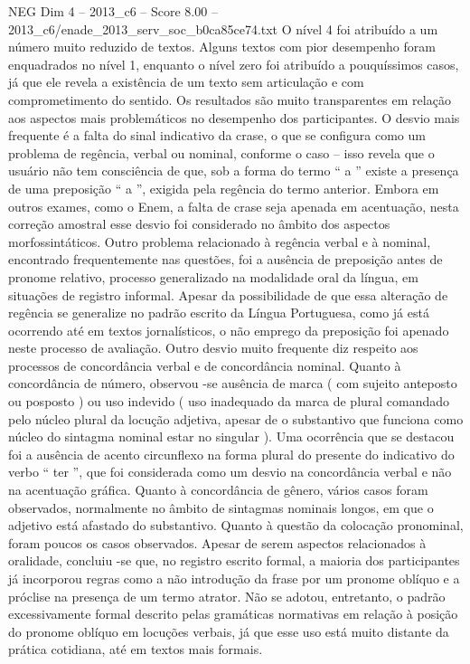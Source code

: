 \begin{textsample}{NEG Dim 4 – 2013\_c6 – Score 8.00 – 2013\_c6/enade\_2013\_serv\_soc\_b0ca85ce74.txt}
O nível 4 foi atribuído a um número muito reduzido de textos.
Alguns textos com pior desempenho foram enquadrados no nível 1, enquanto o nível zero foi atribuído a pouquíssimos casos, já que ele revela a existência de um texto sem articulação e com comprometimento do sentido.
Os resultados são muito transparentes em relação aos aspectos mais problemáticos no desempenho dos participantes.
O desvio mais frequente é a falta do sinal indicativo da crase, o que se configura como um problema de regência, verbal ou nominal, conforme o caso – isso revela que o usuário não tem consciência de que, sob a forma do termo “ a ” existe a presença de uma preposição “ a ”, exigida pela regência do termo anterior.
Embora em outros exames, como o Enem, a falta de crase seja apenada em acentuação, nesta correção amostral esse desvio foi considerado no âmbito dos aspectos morfossintáticos.
Outro problema relacionado à regência verbal e à nominal, encontrado frequentemente nas questões, foi a ausência de preposição antes de pronome relativo, processo generalizado na modalidade oral da língua, em situações de registro informal.
Apesar da possibilidade de que essa alteração de regência se generalize no padrão escrito da Língua Portuguesa, como já está ocorrendo até em textos jornalísticos, o não emprego da preposição foi apenado neste processo de avaliação.
Outro desvio muito frequente diz respeito aos processos de concordância verbal e de concordância nominal.
Quanto à concordância de número, observou -se ausência de marca ( com sujeito anteposto ou posposto ) ou uso indevido ( uso inadequado da marca de plural comandado pelo núcleo plural da locução adjetiva, apesar de o substantivo que funciona como núcleo do sintagma nominal estar no singular ).
Uma ocorrência que se destacou foi a ausência de acento circunflexo na forma plural do presente do indicativo do verbo “ ter ”, que foi considerada como um desvio na concordância verbal e não na acentuação gráfica.
Quanto à concordância de gênero, vários casos foram observados, normalmente no âmbito de sintagmas nominais longos, em que o adjetivo está afastado do substantivo.
Quanto à questão da colocação pronominal, foram poucos os casos observados.
Apesar de serem aspectos relacionados à oralidade, concluiu -se que, no registro escrito formal, a maioria dos participantes já incorporou regras como a não introdução da frase por um pronome oblíquo e a próclise na presença de um termo atrator.
Não se adotou, entretanto, o padrão excessivamente formal descrito pelas gramáticas normativas em relação à posição do pronome oblíquo em locuções verbais, já que esse uso está muito distante da prática cotidiana, até em textos mais formais.

\end{textsample}
